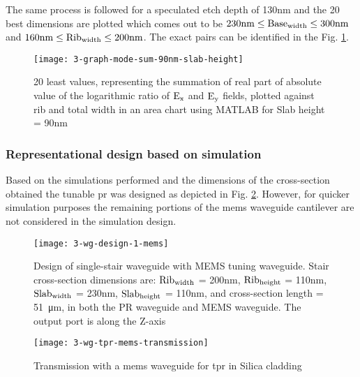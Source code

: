 \documentclass[../report.tex]{subfiles}
\begin{document}
The same process is followed for a speculated etch depth of 130nm and the 20 best dimensions are plotted which comes out to be $\mathrm{230nm \leq Base_{width} \leq 300nm}$ and $\mathrm{160nm \leq Rib_{width} \leq 200nm}$. The exact pairs can be identified in the Fig. \ref{fig:3_graph_mode_sum_90nm_slab_height}.
\begin{figure}[H] %
	\centering
	\texttt{[image: 3-graph-mode-sum-90nm-slab-height]}
	\caption{20 least values, representing the summation of real part of absolute value of the logarithmic ratio of $\mathrm{E_x}$ and $\mathrm{E_y}$ fields, plotted against rib and total width in an area chart using MATLAB for Slab height = 90nm}
	\label{fig:3_graph_mode_sum_90nm_slab_height}
\end{figure}

\subsubsection{Representational design based on simulation}			
Based on the simulations performed and the dimensions of the cross-section obtained the tunable \gls{pr} was designed as depicted in Fig. \ref{fig:3_wg_design_1_mems}. However, for quicker simulation purposes the remaining portions of the \gls{mems} waveguide cantilever are not considered in the simulation design.  

\begin{figure}[H] %
	\centering
	\texttt{[image: 3-wg-design-1-mems]}
	\caption{Design of single-stair waveguide with MEMS tuning waveguide. Stair cross-section dimensions are: $\mathrm{Rib_{width}}$ = 200nm, $\mathrm{Rib_{height}}$ = 110nm, $\mathrm{Slab_{width}}$ = 230nm, $\mathrm{Slab_{height}}$ = 110nm, and cross-section length = \SI{51}{\micro\meter}, in both the PR waveguide and MEMS waveguide. The output port is along the Z-axis}
	\label{fig:3_wg_design_1_mems}
\end{figure}

\begin{figure}[H] %
	\centering
	\texttt{[image: 3-wg-tpr-mems-transmission]}
	\caption{Transmission with a \gls{mems} waveguide for \gls{tpr} in Silica cladding}
	\label{fig:3_wg_tpr_mems_transmission}
\end{figure}
\end{document}
